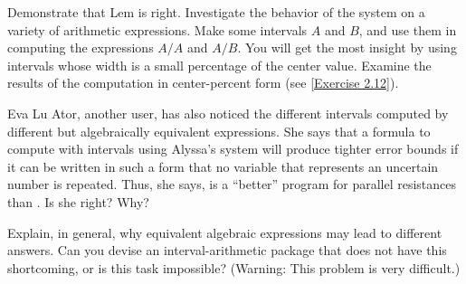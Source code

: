\begin{exercise}
	\label{Exercise 2.14}
	Demonstrate that Lem is right.
	Investigate the behavior of the system on a variety of arithmetic expressions.
	Make some intervals \( A \) and \( B \), and use them in computing the expressions \( A / A \) and \( A / B \).
	You will get the most insight by using intervals whose width is a small percentage of the center value.
	Examine the results of the computation in center-percent form (see \cref{Exercise 2.12}).
\end{exercise}



\begin{exercise}
	\label{Exercise 2.15}
	Eva Lu Ator, another user, has also noticed the different intervals computed by different but algebraically equivalent expressions.
	She says that a formula to compute with intervals using Alyssa’s system will produce tighter error bounds if it can be written in such a form that no variable that represents an uncertain number is repeated.
	Thus, she says,  is a “better” program for parallel resistances than .
	Is she right?
	Why?
\end{exercise}



\begin{exercise}
	\label{Exercise 2.16}
	Explain, in general, why equivalent algebraic expressions may lead to different answers.
	Can you devise an interval-arithmetic package that does not have this shortcoming, or is this task impossible?
	(Warning:
	This problem is very difficult.)
\end{exercise}
